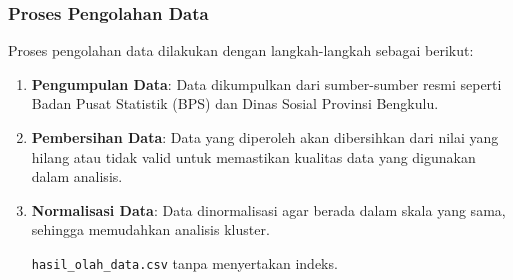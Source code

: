 \documentclass[12pt,a4paper]{article}
\begin{document}
\begin{multicols}{2}
\subsubsection{Proses Pengolahan Data}
Proses pengolahan data dilakukan dengan langkah-langkah sebagai berikut:

\begin{enumerate}
    \item \textbf{Pengumpulan Data}: Data dikumpulkan dari sumber-sumber resmi seperti Badan Pusat Statistik (BPS) dan Dinas Sosial Provinsi Bengkulu.
    
    \item \textbf{Pembersihan Data}: Data yang diperoleh akan dibersihkan dari nilai yang hilang atau tidak valid untuk memastikan kualitas data yang digunakan dalam analisis.
    
    \item \textbf{Normalisasi Data}: Data dinormalisasi agar berada dalam skala yang sama, sehingga memudahkan analisis kluster.
    
    \texttt{hasil\_olah\_data.csv} tanpa menyertakan indeks.
\end{enumerate}




\end{multicols}
\end{document}
